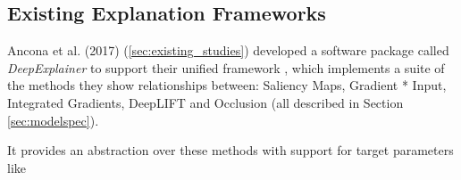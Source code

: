\documentclass[main]{subfiles}
\begin{document}



\subsection{Existing Explanation Frameworks}

Ancona et al. (2017) (\ref{sec:existing_studies}) developed a software package called \textit{DeepExplainer} to support their unified framework \cite{deepexplainerrepo}, which implements a suite of the methods they show relationships between: Saliency Maps, Gradient * Input, Integrated Gradients, DeepLIFT and Occlusion (all described in Section \ref{sec:modelspec}). 

It provides an abstraction over these methods with support for target parameters like 






\end{document}
